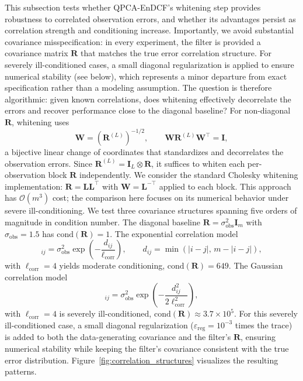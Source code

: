\documentclass[11pt,a4paper]{article}
\begin{document}
This subsection tests whether QPCA-EnDCF's whitening step provides robustness to correlated observation errors, and whether its advantages persist as correlation strength and conditioning increase. Importantly, we avoid substantial covariance misspecification: in every experiment, the filter is provided a covariance matrix $\mathbf{R}$ that matches the true error correlation structure. For severely ill-conditioned cases, a small diagonal regularization is applied to ensure numerical stability (see below), which represents a minor departure from exact specification rather than a modeling assumption. The question is therefore algorithmic: given known correlations, does whitening effectively decorrelate the errors and recover performance close to the diagonal baseline? For non-diagonal $\mathbf{R}$, whitening uses
\begin{equation}
\mathbf{W} = (\mathbf{R}^{(L)})^{-1/2},
\qquad
\mathbf{W}\mathbf{R}^{(L)}\mathbf{W}^{\top} = \mathbf{I},
\end{equation}
a bijective linear change of coordinates that standardizes and decorrelates the observation errors. Since $\mathbf{R}^{(L)}=\mathbf{I}_L\otimes\mathbf{R}$, it suffices to whiten each per-observation block $\mathbf{R}$ independently. We consider the standard Cholesky whitening implementation: $\mathbf{R}=\mathbf{L}\mathbf{L}^{\top}$ with $\mathbf{W}=\mathbf{L}^{-\top}$ applied to each block. This approach has $\mathcal{O}(m^3)$ cost; the comparison here focuses on its numerical behavior under severe ill-conditioning. We test three covariance structures spanning five orders of magnitude in condition number. The diagonal baseline $\mathbf{R}=\sigma_{\mathrm{obs}}^2\mathbf{I}_m$ with $\sigma_{\mathrm{obs}}=1.5$ has $\mathrm{cond}(\mathbf{R})=1$. The exponential correlation model
\begin{equation}
[\mathbf{R}]_{ij}=\sigma_{\mathrm{obs}}^2\exp\!\left(-\frac{d_{ij}}{\ell_{\mathrm{corr}}}\right),
\qquad
d_{ij}=\min(|i-j|,\,m-|i-j|),
\end{equation}
with $\ell_{\mathrm{corr}}=4$ yields moderate conditioning, $\mathrm{cond}(\mathbf{R})=649$. The Gaussian correlation model
\begin{equation}
[\mathbf{R}]_{ij}=\sigma_{\mathrm{obs}}^2\exp\!\left(-\frac{d_{ij}^2}{2\ell_{\mathrm{corr}}^2}\right),
\end{equation}
with $\ell_{\mathrm{corr}}=4$ is severely ill-conditioned, $\mathrm{cond}(\mathbf{R})\approx 3.7\times10^5$. For this severely ill-conditioned case, a small diagonal regularization ($\varepsilon_{\mathrm{reg}}=10^{-3}$ times the trace) is added to both the data-generating covariance and the filter's $\mathbf{R}$, ensuring numerical stability while keeping the filter's covariance consistent with the true error distribution. Figure~\ref{fig:correlation_structures} visualizes the resulting patterns.
\end{document}
